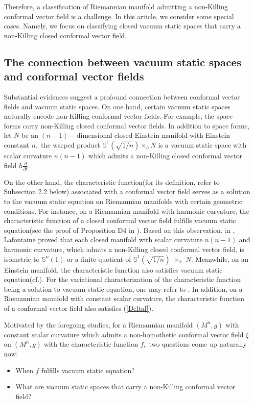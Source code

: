 \documentclass[10pt,leqno,oneside]{amsart}
\begin{document}
          Therefore, a classification of Riemannian manifold admitting a non-Killing conformal vector field is a challenge. In this article, we consider some special cases. Namely, we focus on classifying closed vacuum static spaces that carry a non-Killing closed conformal vector field.
    \subsection{The connection between vacuum static spaces and conformal vector fields}
          Substantial evidences suggest a profound connection between conformal vector fields and vacuum static spaces. On one hand, certain vacuum static spaces naturally encode non-Killing conformal vector fields. For example, the space forms carry non-Killing closed conformal vector fields. In addition to space forms, let $N$ be an $(n-1)-$dimensional closed Einstein manifold with Einstein constant $n,$ the warped product $\mathbb S^1(\sqrt{1/n})\times_h N$ is a vacuum static space with scalar curvature $n(n-1)$ which admits a non-Killing closed conformal vector field $h\frac{\partial}{\partial t}.$

          On the other hand, the characteristic function(for its definition, refer to Subsection 2.2 below) associated with a conformal vector field serves as a solution to the vacuum static equation on Riemannian manifolds with certain geometric conditions. For instance, on a Riemannian manifold with harmonic curvature, the characteristic function of a closed conformal vector field fulfills vacuum static equation(see the proof of Proposition D4 in \cite{Lafontaine1983}). Based on this observation, in \cite[Proposition D4]{Lafontaine1983}, Lafontaine proved that each closed manifold with scalar curvature $n(n-1)$ and harmonic curvature, which admits a non-Killing closed conformal vector field, is isometric to $\mathbb S^n(1)$ or a finite quotient of $\mathbb S^1(\sqrt{1/n})$ $\times_h$ $N.$ 
          Meanwhile, on an Einstein manifold, the characteristic function also satisfies vacuum static equation(cf.\cite[Lemma 2.2]{Herzlich2016}). For the variational characterization of the characteristic function being a solution to vacuum static equation, one may refer to \cite[Theorem 1.1]{MT2017}. In addition, on a Riemannian manifold with constant scalar curvature, the characteristic function of a conformal vector field also satisfies (\ref{Deltaf}).

          Motivated by the foregoing studies, for a Riemannian manifold $(M^n, g)$ with constant scalar curvature which admits a non-homothetic conformal vector field $\xi$ on $(M^n, g)$ with the characteristic function $f,$ two questions come up naturally now:
          \begin{itemize}
            \item[1.] When $f$ fulfills vacuum static equation?
            \item[2.] What are vacuum static spaces that carry a non-Killing conformal vector field?
          \end{itemize}
\end{document}

